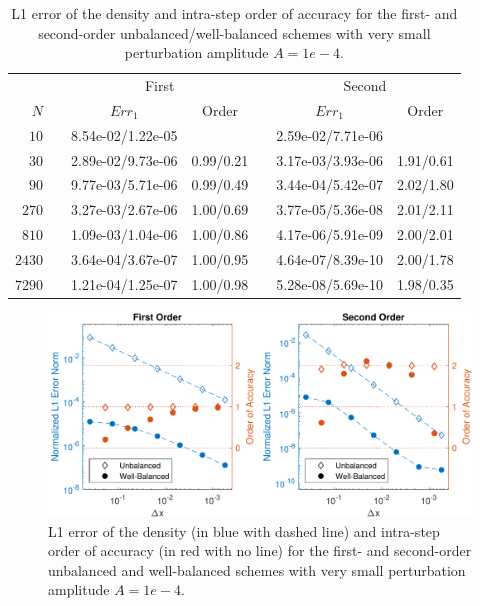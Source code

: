 \begin{table}\centering
\caption{L1 error of the density and intra-step order of accuracy for the first- and second-order unbalanced/well-balanced schemes with very small perturbation amplitude $A=1e-4$.}
\label{table:OVS_Asmall}
\begin{tabular}{@{}rcccccc@{}}\toprule
& \phantom{a} & \multicolumn{2}{c}{First} & \phantom{ab} & \multicolumn{2}{c}{Second}\\
\cmidrule{3-4} \cmidrule{6-7}
$N$ && $Err_1$ & Order && $Err_1$ & Order\\ \midrule
$10$ && 8.54e-02/1.22e-05 &&& 2.59e-02/7.71e-06 &\\
$30$ && 2.89e-02/9.73e-06 & 0.99/0.21 && 3.17e-03/3.93e-06 & 1.91/0.61\\
$90$ && 9.77e-03/5.71e-06 & 0.99/0.49 && 3.44e-04/5.42e-07 & 2.02/1.80\\
$270$ && 3.27e-03/2.67e-06 & 1.00/0.69 && 3.77e-05/5.36e-08 & 2.01/2.11\\
$810$ && 1.09e-03/1.04e-06 & 1.00/0.86 && 4.17e-06/5.91e-09 & 2.00/2.01\\
$2430$ && 3.64e-04/3.67e-07 & 1.00/0.95 && 4.64e-07/8.39e-10 & 2.00/1.78\\
$7290$ && 1.21e-04/1.25e-07 & 1.00/0.98 && 5.28e-08/5.69e-10 & 1.98/0.35\\
\bottomrule
\end{tabular}
\end{table}

\begin {figure}
\centering
\includegraphics[width=13cm]{figures/OVSeps0_0001}
\caption {L1 error of the density (in blue with dashed line) and intra-step order of accuracy (in red with no line) for the first- and second-order unbalanced and well-balanced schemes with very small perturbation amplitude $A=1e-4$.}
\label{fig:OVS_Asmall}
\end{figure}

